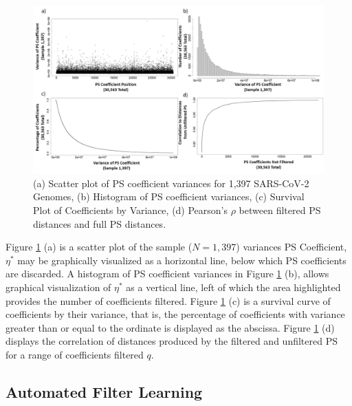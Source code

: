 \documentclass[10pt,conference]{IEEEtran}
\begin{document}
\begin{figure}[h!] 
\caption{(a) Scatter plot of PS coefficient variances for 1,397 SARS-CoV-2 Genomes, (b) Histogram of PS coefficient variances, (c) Survival Plot of Coefficients by Variance, (d) Pearson's $\rho$ between filtered PS distances and full PS distances. \label{fig:coeffvar}} 
\vspace{0.5 em}
\centering
\includegraphics[scale=0.27]{Images/Files/VarianceFiltCombined.jpg}
\end{figure}


Figure \ref{fig:coeffvar} (a) is a scatter plot of the sample ($N=1,397$) variances PS Coefficient, $\eta^*$ may 
be graphically visualized as a horizontal line, below which PS coefficients are discarded. 
A histogram of PS coefficient variances in Figure \ref{fig:coeffvar} (b), allows graphical visualization of $\eta^*$ as a vertical line, left of which the area highlighted  provides the number of coefficients filtered.  
Figure \ref{fig:coeffvar} (c) is a survival curve of coefficients by their variance, that is, the
percentage of coefficients with variance greater than or equal to the ordinate is displayed as the 
abscissa. 
Figure \ref{fig:coeffvar} (d) displays the correlation of distances produced by the filtered and unfiltered PS for a range of coefficients filtered $q$. 


\subsection{Automated Filter Learning}
\vspace{-2 em}
\end{document}
